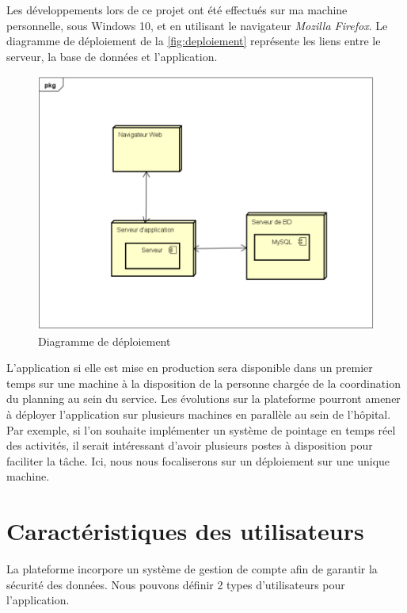\documentclass{polytech/polytech}
\begin{document}
Les développements lors de ce projet ont été effectués sur ma machine personnelle, sous Windows 10, et en utilisant le navigateur \textit{Mozilla Firefox}. Le diagramme de déploiement de la \autoref{fig:deploiement} représente les liens entre le serveur, la base de données et l'application. 

\begin{figure}
	\includegraphics[scale=0.8]{images/deploiement}
	\caption{Diagramme de déploiement}
	\label{fig:deploiement}
\end{figure}

L'application si elle est mise en production sera disponible dans un premier temps sur une machine à la disposition de la personne chargée de la coordination du planning au sein du service. Les évolutions sur la plateforme pourront amener à déployer l'application sur plusieurs machines en parallèle au sein de l'hôpital. Par exemple, si l'on souhaite implémenter un système de pointage en temps réel des activités, il serait intéressant d'avoir plusieurs postes à disposition pour faciliter la tâche. Ici, nous nous focaliserons sur un déploiement sur une unique machine. 


\section{Caractéristiques des utilisateurs}
\label{sec:caracUtili}

La plateforme incorpore un système de gestion de compte afin de garantir la sécurité des données. Nous pouvons définir 2 types d'utilisateurs pour l'application.
\end{document}
